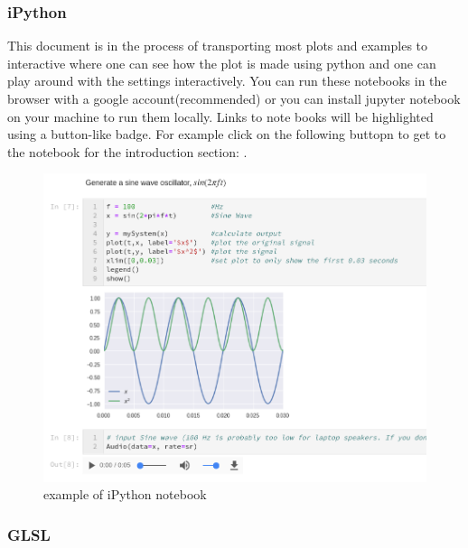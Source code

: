 \subsubsection*{iPython}
This document is in the process of transporting most plots and examples to interactive  where one can see how the plot is made using python and one can play around with the settings interactively. You can run these notebooks in the browser with a google account(recommended) or you can install jupyter notebook on your machine to run them locally. Links to note books will be highlighted using a button-like badge. For example click on the following buttopn to get to the notebook for the introduction section: .


\begin{figure}[H]
	\centering
	\includegraphics[width=\textwidth]{img/notenookExample.png}
	\caption[example of iPython notebook]
	{example of iPython notebook}
	\label{fig:ipython}
\end{figure}

\subsubsection*{GLSL}




